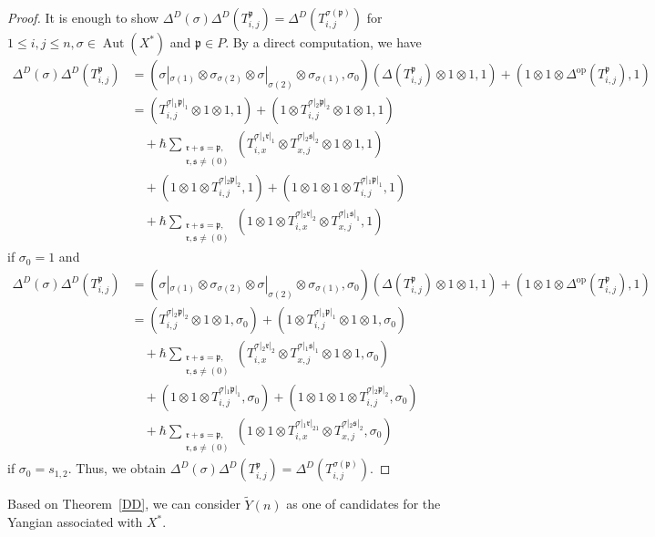 \documentclass{article}
\theoremstyle{definition}
\theoremstyle{remark}
\numberwithin{equation}{section}
\DeclareMathOperator{\Aut}{Aut}
\numberwithin{equation}{section}
\begin{document}
\begin{proof}
It is enough to show $\Delta^D(\sigma)\Delta^D(T^{\mathfrak{p}}_{i,j})=\Delta^D(T^{\sigma(\mathfrak{p})}_{i,j})$ for $1\leq i,j\leq n,\sigma\in\Aut(X^*)$ and $\mathfrak{p}\in P$. By a direct computation, we have
\begin{align*}
\Delta^D(\sigma)\Delta^D(T^{\mathfrak{p}}_{i,j})
&=(\sigma|_{\sigma(1)}\otimes\sigma_{\sigma(2)}\otimes \sigma|_{\sigma(2)}\otimes\sigma_{\sigma(1)},\sigma_0)(\Delta(T^{\mathfrak{p}}_{i,j})\otimes1\otimes1,1)+(1\otimes1\otimes\Delta^{\text{op}}(T^{\mathfrak{p}}_{i,j}),1)\\
&=(T^{\sigma|_1\mathfrak{p}|_1}_{i,j}\otimes1\otimes1,1)+(1\otimes T^{\sigma|_2\mathfrak{p}|_2}_{i,j}\otimes1\otimes1,1)\\
&\quad+\hbar\sum_{\substack{\mathfrak{r}+\mathfrak{s}=\mathfrak{p},\\\mathfrak{r},\mathfrak{s}\neq(0)}}(T^{\sigma|_1\mathfrak{r}|_1}_{i,x}\otimes T^{\sigma|_2\mathfrak{s}|_2}_{x,j}\otimes1\otimes1,1)\\
&\quad+(1\otimes1\otimes T^{\sigma|_2\mathfrak{p}|_2}_{i,j},1)+(1\otimes1\otimes1\otimes T^{\sigma|_1\mathfrak{p}|_1}_{i,j},1)\\
&\quad+\hbar\sum_{\substack{\mathfrak{r}+\mathfrak{s}=\mathfrak{p},\\\mathfrak{r},\mathfrak{s}\neq(0)}}(1\otimes1\otimes T^{\sigma|_2\mathfrak{r}|_2}_{i,x}\otimes T^{\sigma|_1\mathfrak{s}|_1}_{x,j},1)
\end{align*}
if $\sigma_0=1$ and
\begin{align*}
\Delta^D(\sigma)\Delta^D(T^{\mathfrak{p}}_{i,j})
&=(\sigma|_{\sigma(1)}\otimes\sigma_{\sigma(2)}\otimes \sigma|_{\sigma(2)}\otimes\sigma_{\sigma(1)},\sigma_0)(\Delta(T^{\mathfrak{p}}_{i,j})\otimes1\otimes1,1)+(1\otimes1\otimes\Delta^{\text{op}}(T^{\mathfrak{p}}_{i,j}),1)\\
&=(T^{\sigma|_2\mathfrak{p}|_2}_{i,j}\otimes1\otimes1,\sigma_0)+(1\otimes T^{\sigma|_1\mathfrak{p}|_1}_{i,j}\otimes1\otimes1,\sigma_0)\\
&\quad+\hbar\sum_{\substack{\mathfrak{r}+\mathfrak{s}=\mathfrak{p},\\\mathfrak{r},\mathfrak{s}\neq(0)}}(T^{\sigma|_2\mathfrak{r}|_2}_{i,x}\otimes T^{\sigma|_1\mathfrak{s}|_1}_{x,j}\otimes1\otimes1,\sigma_0)\\
&\quad+(1\otimes1\otimes T^{\sigma|_1\mathfrak{p}|_1}_{i,j},\sigma_0)+(1\otimes1\otimes1\otimes T^{\sigma|_2\mathfrak{p}|_2}_{i,j},\sigma_0)\\
&\quad+\hbar\sum_{\substack{\mathfrak{r}+\mathfrak{s}=\mathfrak{p},\\\mathfrak{r},\mathfrak{s}\neq(0)}}(1\otimes1\otimes T^{\sigma|_1\mathfrak{r}|_21}_{i,x}\otimes T^{\sigma|_2\mathfrak{s}|_2}_{x,j},\sigma_0)
\end{align*}
if $\sigma_0=s_{1,2}$. Thus, we obtain $\Delta^D(\sigma)\Delta^D(T^{\mathfrak{p}}_{i,j})=\Delta^D(T^{\sigma(\mathfrak{p})}_{i,j})$.
\end{proof}
Based on Theorem~\ref{DD}, we can consider $\widetilde{Y}(n)$ as one of candidates for the Yangian associated with $X^*$.
\end{document}
